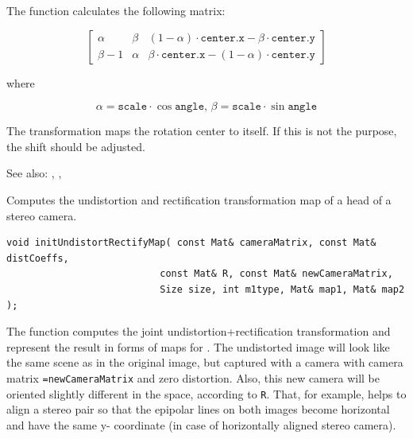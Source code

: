 The function calculates the following matrix:

\[
\begin{bmatrix}
\alpha & \beta & (1-\alpha) \cdot \texttt{center.x} - \beta \cdot \texttt{center.y} \\
\beta - 1 & \alpha & \beta \cdot \texttt{center.x} - (1-\alpha) \cdot \texttt{center.y}
\end{bmatrix}
\]

where

\[
\alpha = \texttt{scale} \cdot \cos \texttt{angle},\,\beta = \texttt{scale} \cdot \sin \texttt{angle}
\]

The transformation maps the rotation center to itself. If this is not the purpose, the shift should be adjusted.

See also: , , 

\label{initUndistortRectifyMap}
Computes the undistortion and rectification transformation map of a head of a stereo camera.

\begin{lstlisting}
void initUndistortRectifyMap( const Mat& cameraMatrix, const Mat& distCoeffs,
                           const Mat& R, const Mat& newCameraMatrix,
                           Size size, int m1type, Mat& map1, Mat& map2 );
\end{lstlisting}
\begin{description}
\end{description}

The function computes the joint undistortion+rectification transformation and represent the result in forms of maps for . The undistorted image will look like the same scene as in the original image, but captured with a camera with camera matrix \texttt{=newCameraMatrix} and zero distortion. Also, this new camera will be oriented slightly different in the space, according to \texttt{R}. That, for example, helps to align a stereo pair so that the epipolar lines on both images become horizontal and have the same y- coordinate (in case of horizontally aligned stereo camera).

